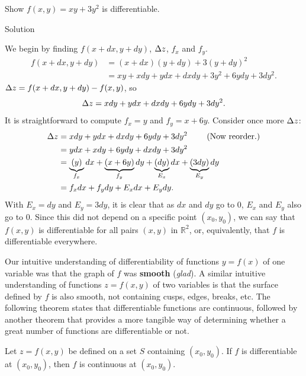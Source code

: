\begin{example}\label{ex_totaldiff1}
Show $f(x,y) = xy+3y^2$ is differentiable.

Solution 

We begin by finding $f(x+dx,y+dy)$, $\Delta z$, $f_x$ and $f_y$.
\begin{align*}
f(x+dx,y+dy) &= (x+dx)(y+dy) + 3(y+dy)^2 \\
						&= xy + xdy+ydx+dxdy + 3y^2+6ydy+3dy^2.
\end{align*}
$\Delta z = f(x+dx,y+dy) - f(x,y)$, so
$$\Delta z = xdy + ydx + dxdy + 6ydy+3dy^2.$$
It is straightforward to compute $f_x = y$ and $f_y = x+6y$. Consider once more $\Delta z$:
\begin{align*}
\Delta z &= xdy + ydx + dxdy + 6ydy+3dy^2 \qquad \text{ (Now reorder.)}\\
		&= ydx + xdy+6ydy+ dxdy + 3dy^2\\
		&= \underbrace{(y)}_{f_x}dx + \underbrace{(x+6y)}_{f_y}dy + \underbrace{(dy)}_{E_x}dx+\underbrace{(3dy)}_{E_y}dy\\
		&= f_xdx + f_ydy + E_xdx+E_ydy.
\end{align*}
With $E_x = dy$ and $E_y = 3dy$, it is clear that as $dx$ and $ dy$ go to 0, $E_x$ and $E_y$ also go to 0. Since this did not depend on a specific point $(x_0,y_0)$, we can say that $f(x,y)$ is differentiable for all pairs $(x,y)$ in $\mathbb{R}^2$, or, equivalently, that $f$ is differentiable everywhere. 
\end{example}

Our intuitive understanding of differentiability of functions $y=f(x)$ of one variable was that the graph of $f$ was \textbf{smooth} (\textit{glad}). A similar intuitive understanding of functions $z=f(x,y)$ of two variables is that the surface defined by $f$ is also smooth, not containing cusps, edges, breaks,  etc. The following theorem states that differentiable functions are continuous, followed by another theorem that   provides a
more tangible way of determining whether a great number of functions are differentiable or not.

\begin{theorem}\label{thm:diff_cont_multi}
Let $z=f(x,y)$ be defined on a set $S$ containing $(x_0,y_0)$. 
If $f$ is differentiable at $(x_0,y_0)$, then $f$ is continuous at $(x_0,y_0)$.
\end{theorem}

